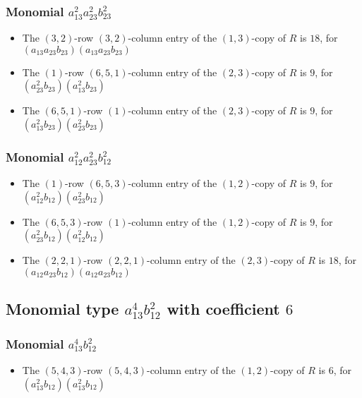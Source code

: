 \documentclass{article}
\begin{document}
\subsubsection{Monomial $ a_{13}^{2} a_{23}^{2} b_{23}^{2} $}

\begin{itemize}
\item The $(3, 2)$-row $(3, 2)$-column entry of the $ \left(1, 3\right) $-copy of $R$ is $ 18 $, for $( a_{13} a_{23} b_{23} )( a_{13} a_{23} b_{23} )$ 
\item The $(1)$-row $(6, 5, 1)$-column entry of the $ \left(2, 3\right) $-copy of $R$ is $ 9 $, for $( a_{23}^{2} b_{23} )( a_{13}^{2} b_{23} )$ 
\item The $(6, 5, 1)$-row $(1)$-column entry of the $ \left(2, 3\right) $-copy of $R$ is $ 9 $, for $( a_{13}^{2} b_{23} )( a_{23}^{2} b_{23} )$ 
\end{itemize}
\subsubsection{Monomial $ a_{12}^{2} a_{23}^{2} b_{12}^{2} $}

\begin{itemize}
\item The $(1)$-row $(6, 5, 3)$-column entry of the $ \left(1, 2\right) $-copy of $R$ is $ 9 $, for $( a_{12}^{2} b_{12} )( a_{23}^{2} b_{12} )$ 
\item The $(6, 5, 3)$-row $(1)$-column entry of the $ \left(1, 2\right) $-copy of $R$ is $ 9 $, for $( a_{23}^{2} b_{12} )( a_{12}^{2} b_{12} )$ 
\item The $(2, 2, 1)$-row $(2, 2, 1)$-column entry of the $ \left(2, 3\right) $-copy of $R$ is $ 18 $, for $( a_{12} a_{23} b_{12} )( a_{12} a_{23} b_{12} )$ 
\end{itemize}
\subsection{Monomial type $ a_{13}^{4} b_{12}^{2} $ with coefficient $ 6 $}

\subsubsection{Monomial $ a_{13}^{4} b_{12}^{2} $}

\begin{itemize}
\item The $(5, 4, 3)$-row $(5, 4, 3)$-column entry of the $ \left(1, 2\right) $-copy of $R$ is $ 6 $, for $( a_{13}^{2} b_{12} )( a_{13}^{2} b_{12} )$ 
\end{itemize}
\end{document}
